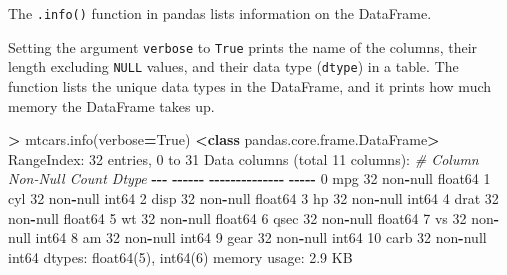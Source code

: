 \documentclass[
]{book}
\newenvironment{Shaded}{\begin{snugshade}}{\end{snugshade}}
\newcommand{\CommentTok}[1]{\textcolor[rgb]{0.56,0.35,0.01}{\textit{#1}}}
\newcommand{\DecValTok}[1]{\textcolor[rgb]{0.00,0.00,0.81}{#1}}
\newcommand{\FloatTok}[1]{\textcolor[rgb]{0.00,0.00,0.81}{#1}}
\newcommand{\KeywordTok}[1]{\textcolor[rgb]{0.13,0.29,0.53}{\textbf{#1}}}
\newcommand{\NormalTok}[1]{#1}
\newcommand{\OperatorTok}[1]{\textcolor[rgb]{0.81,0.36,0.00}{\textbf{#1}}}
\newcommand{\StringTok}[1]{\textcolor[rgb]{0.31,0.60,0.02}{#1}}
\newcommand{\VariableTok}[1]{\textcolor[rgb]{0.00,0.00,0.00}{#1}}
\begin{document}
The \texttt{.info()} function in pandas lists information on the DataFrame.

Setting the argument \texttt{verbose} to \texttt{True} prints the name of the columns, their length excluding \texttt{NULL} values, and their data type (\texttt{dtype}) in a table. The function lists the unique data types in the DataFrame, and it prints how much memory the DataFrame takes up.

\begin{Shaded}
\begin{Highlighting}[]
\OperatorTok{\textgreater{}}\NormalTok{ mtcars.info(verbose}\OperatorTok{=}\VariableTok{True}\NormalTok{)}
\OperatorTok{\textless{}}\KeywordTok{class} \StringTok{\textquotesingle{}pandas.core.frame.DataFrame\textquotesingle{}}\OperatorTok{\textgreater{}}
\NormalTok{RangeIndex: }\DecValTok{32}\NormalTok{ entries, }\DecValTok{0}\NormalTok{ to }\DecValTok{31}
\NormalTok{Data columns (total }\DecValTok{11}\NormalTok{ columns):}
 \CommentTok{\#   Column  Non{-}Null Count  Dtype  }
\OperatorTok{{-}{-}{-}}  \OperatorTok{{-}{-}{-}{-}{-}{-}}  \OperatorTok{{-}{-}{-}{-}{-}{-}{-}{-}{-}{-}{-}{-}{-}{-}}  \OperatorTok{{-}{-}{-}{-}{-}}  
 \DecValTok{0}\NormalTok{   mpg     }\DecValTok{32}\NormalTok{ non}\OperatorTok{{-}}\NormalTok{null     float64}
 \DecValTok{1}\NormalTok{   cyl     }\DecValTok{32}\NormalTok{ non}\OperatorTok{{-}}\NormalTok{null     int64  }
 \DecValTok{2}\NormalTok{   disp    }\DecValTok{32}\NormalTok{ non}\OperatorTok{{-}}\NormalTok{null     float64}
 \DecValTok{3}\NormalTok{   hp      }\DecValTok{32}\NormalTok{ non}\OperatorTok{{-}}\NormalTok{null     int64  }
 \DecValTok{4}\NormalTok{   drat    }\DecValTok{32}\NormalTok{ non}\OperatorTok{{-}}\NormalTok{null     float64}
 \DecValTok{5}\NormalTok{   wt      }\DecValTok{32}\NormalTok{ non}\OperatorTok{{-}}\NormalTok{null     float64}
 \DecValTok{6}\NormalTok{   qsec    }\DecValTok{32}\NormalTok{ non}\OperatorTok{{-}}\NormalTok{null     float64}
 \DecValTok{7}\NormalTok{   vs      }\DecValTok{32}\NormalTok{ non}\OperatorTok{{-}}\NormalTok{null     int64  }
 \DecValTok{8}\NormalTok{   am      }\DecValTok{32}\NormalTok{ non}\OperatorTok{{-}}\NormalTok{null     int64  }
 \DecValTok{9}\NormalTok{   gear    }\DecValTok{32}\NormalTok{ non}\OperatorTok{{-}}\NormalTok{null     int64  }
 \DecValTok{10}\NormalTok{  carb    }\DecValTok{32}\NormalTok{ non}\OperatorTok{{-}}\NormalTok{null     int64  }
\NormalTok{dtypes: float64(}\DecValTok{5}\NormalTok{), int64(}\DecValTok{6}\NormalTok{)}
\NormalTok{memory usage: }\FloatTok{2.9}\NormalTok{ KB}
\end{Highlighting}
\end{Shaded}
\end{document}
